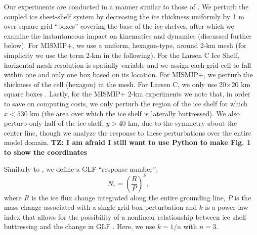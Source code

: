 \documentclass[tc, manuscript]{copernicus}
\begin{document}
Our experiments are conducted in a manner similar to those of \citet{reese2018}. We perturb the coupled ice sheet-shelf system by decreasing the ice thickness uniformly by 1 m over square grid ``boxes'' covering the base of the ice shelves, after which we examine the instantaneous impact on kinematics and dynamics (discussed further below). For MISMIP+, we use a uniform, hexagon-type, around 2-km mesh (for simplicity we use the term 2-km in the following). For the Larsen C Ice Shelf, horizontal mesh resolution is spatially variable and we assign each grid cell to fall within one and only one box based on its location. For MISMIP+, we perturb the thickness of the cell (hexagon) in the mesh. For Larsen C, we only use 20$\times$20 km square boxes \citep[the same resolution as in][]{reese2018}. Lastly, for the MISMIP+ 2-km experiments we note that, in order to save on computing costs, we only perturb the region of the ice shelf for which $x<530$ km (the area over which the ice shelf is laterally buttressed).  We also perturb only half of the ice shelf, $y>40$ km, due to the symmetry about the center line, though we analyze the response to these perturbations over the entire model domain. \textbf{TZ: I am afraid I still want to use Python to make Fig. 1 to show the coordinates}

Similarly to \citet{reese2018}, we define a GLF ``response number'',
\begin{equation}
N_r = \left(\frac{R}{P}\right)^k,
\end{equation}
where $R$ is the ice flux change integrated along the entire grounding line, $P$ is the mass change associated with a single grid-box perturbation and $k$ is a power-law index that allows for the possibility of a nonlinear relationship between ice shelf buttressing and the change in GLF \citep[see also][]{schoof2007}. Here, we use $k=1/n$ with $n=3$.
\end{document}
